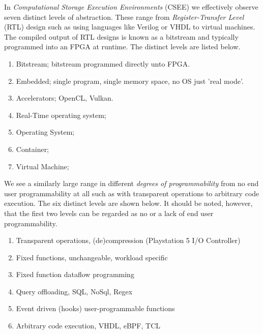 

In \textit{Computational Storage Execution Environments} (CSEE) we effectively
observe seven distinct levels of abstraction. These range from
\textit{Register-Transfer Level} (RTL) design such as using languages like
Verilog or VHDL to virtual machines. The compiled output of RTL designs is known
as a bitstream and typically programmed into an FPGA at runtime. The distinct
levels are listed below.

\begin{enumerate}
    \item Bitstream; bitstream programmed directly unto FPGA.
    \item Embedded; single program, single memory space, no OS just 'real mode'.
    \item Accelerators; OpenCL, Vulkan.
    \item Real-Time operating system;
    \item Operating System;
    \item Container;
    \item Virtual Machine;
\end{enumerate}

We see a similarly large range in different \textit{degrees of programmability}
from no end user programmability at all such as with transparent operations to
arbitrary code execution. The six distinct levels are shown below. It
should be noted, however, that the first two levels can be regarded as no or a
lack of end user programmability.

\begin{enumerate}
    \item Transparent operations, (de)compression (Playstation 5 I/O Controller)
    \item Fixed functions, unchangeable, workload specific \cite{2013-fast-active-flash}
    \item Fixed function dataflow programming \cite{Wickremesinghe02distributedcomputing}
    \item Query offloading, SQL\footnotemark[3], NoSql, Regex \cite{10.14778/2994509.2994512}
    \item Event driven (hooks) user-programmable functions \cite{10.1145/3429357.3430519}
    \item Arbitrary code execution, VHDL, eBPF, TCL \cite{10.1145/605432.605425, kourtis2020safe}
\end{enumerate}

